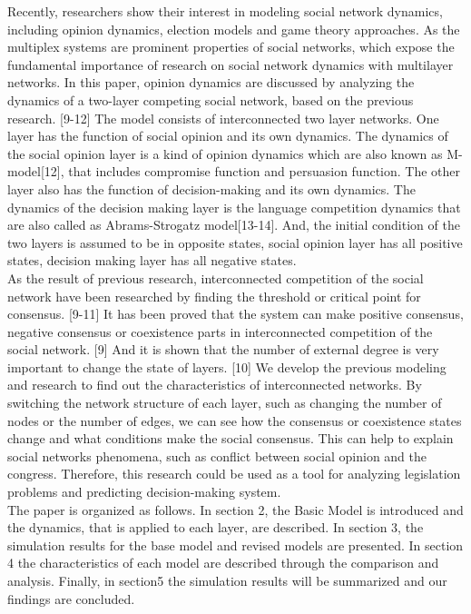 \documentclass[english]{cccconf}
\begin{document}
Recently, researchers show their interest in modeling social network dynamics, including opinion dynamics, election models and game theory approaches. As the multiplex systems are prominent properties of social networks, which expose the fundamental importance of research on social network dynamics with multilayer networks.  In this paper, opinion dynamics are discussed by analyzing the dynamics of a two-layer competing social network, based on the previous research. [9-12] The model consists of interconnected two layer networks. One layer has the function of social opinion and its own dynamics. The dynamics of the social opinion layer is a kind of opinion dynamics which are also known as M-model[12], that includes compromise function and persuasion function. The other layer also has the function of decision-making and its own dynamics. The dynamics of the decision making layer is the language competition dynamics that are also called as Abrams-Strogatz model[13-14]. And, the initial condition of the two layers is assumed to be in opposite states, social opinion layer has all positive states, decision making layer has all negative states.\\
As the result of previous research, interconnected competition of the social network have been researched by finding the threshold or critical point for consensus. [9-11] It has been proved that the system can make positive consensus, negative consensus or coexistence parts in interconnected competition of the social network. [9] And it is shown that the number of external degree is very important to change the state of layers. [10] We develop the previous modeling and research to find out the characteristics of interconnected networks. By switching the network structure of each layer, such as changing the number of nodes or the number of edges, we can see how the consensus or coexistence states change and what conditions make the social consensus. This can help to explain social networks phenomena, such as conflict between social opinion and the congress. Therefore, this research could be used as a tool for analyzing legislation problems and predicting decision-making system. \\
The paper is organized as follows. In section 2, the Basic Model is introduced and the dynamics, that is applied to each layer, are described.  In section 3, the simulation results for the base model and revised models are presented. In section 4 the characteristics of each model are described through the comparison and analysis. Finally, in section5 the simulation results will be summarized and our findings are concluded.
\end{document}
